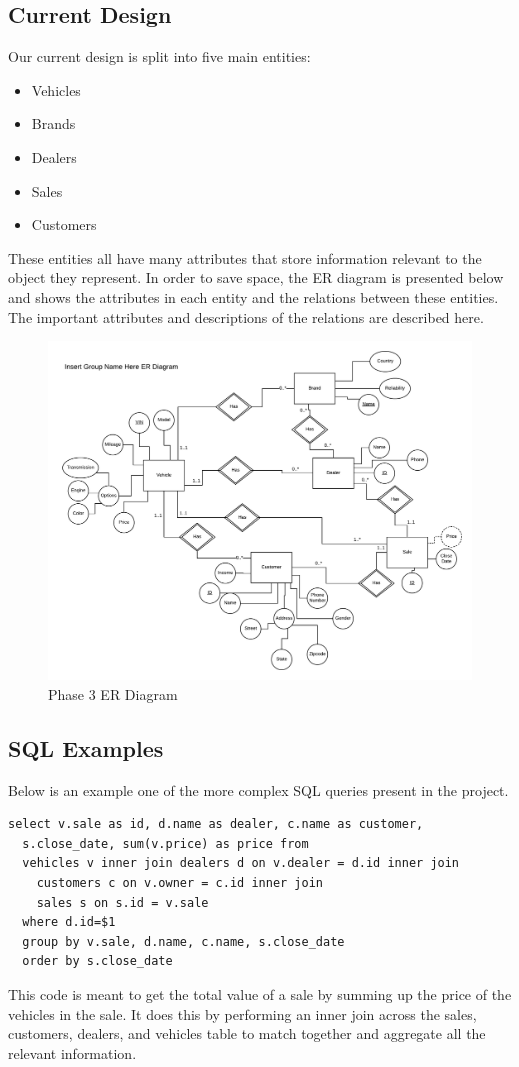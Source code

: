 \documentclass{math}
\begin{document}
\subsection*{Current Design}
Our current design is split into five main entities:
\begin{itemize}
  \item Vehicles
  \item Brands
  \item Dealers
  \item Sales
  \item Customers
\end{itemize}
These entities all have many attributes that store information relevant to the
object they represent. In order to save space, the ER diagram is presented
below and shows the attributes in each entity and the relations between these
entities. The important attributes and descriptions of the relations are
described here.
\begin{figure}[H]
  \centering
  \includegraphics[width=16cm]{assets/phase3_er_diagram.png}
  \caption{Phase 3 ER Diagram}
\end{figure}

\subsection*{SQL Examples}
Below is an example one of the more complex SQL queries present in the project.
\begin{lstlisting}
select v.sale as id, d.name as dealer, c.name as customer,
  s.close_date, sum(v.price) as price from
  vehicles v inner join dealers d on v.dealer = d.id inner join
    customers c on v.owner = c.id inner join
    sales s on s.id = v.sale
  where d.id=$1
  group by v.sale, d.name, c.name, s.close_date
  order by s.close_date
\end{lstlisting}
This code is meant to get the total value of a sale by summing up the price of
the vehicles in the sale. It does this by performing an inner join across the
sales, customers, dealers, and vehicles table to match together and aggregate
all the relevant information.
\end{document}
